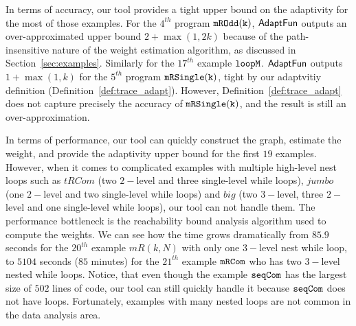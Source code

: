 In terms of accuracy, our tool provides a tight
upper bound on the adaptivity for the most of those examples. 
 For the $4^{th}$ program $\mathtt{mROdd(k)}$, $\textsf{AdaptFun}$ outputs an over-approximated upper bound 
 $2 + \max(1, 2k)$ because of the path-insensitive nature of the weight estimation algorithm, as discussed in Section~\ref{sec:examples}. 
 Similarly for the $17^{th}$ example $\mathtt{loopM}$. 
$\textsf{AdaptFun}$ outputs $1 + \max(1, k) $ for the $5^{th}$ program $\mathtt{mRSingle(k)}$,  tight by our adaptvitiy definition (Definition~\ref{def:trace_adapt}).
However, Definition~\ref{def:trace_adapt} does not capture precisely the accuracy  of $\mathtt{mRSingle(k)}$,
and the result is still an over-approximation.

In terms of performance, our tool can quickly construct the graph, estimate the weight,
and provide the adaptivity upper bound for the first $19$ examples.
 However, when it comes to complicated examples with multiple high-level nest loops such as $tRCom$ (two $2-$level and three single-level while loops), $jumbo$ (one $2-$level and two single-level while loops) and $big$ (two $3-$level, three $2-$level and one single-level while loops),
our tool can not handle them. The performance bottleneck is the reachability bound analysis algorithm used to compute the weights.
We can see how the time grows dramatically from $85.9$ seconds for the $20^{th}$ example $mR(k,N)$ with only one $3-$level nest while loop,
to $5104$ seconds ($85$ minutes) for the $21^{th}$ example $\mathtt{mRCom}$ who has two $3-$level nested while loops. 
Notice, that even though the example $\mathtt{seqCom}$ has the largest size of $502$ lines 
of code, our tool can still quickly handle it because $\mathtt{seqCom}$ does not have loops. Fortunately, examples with many nested loops are not common in the data analysis area. 



